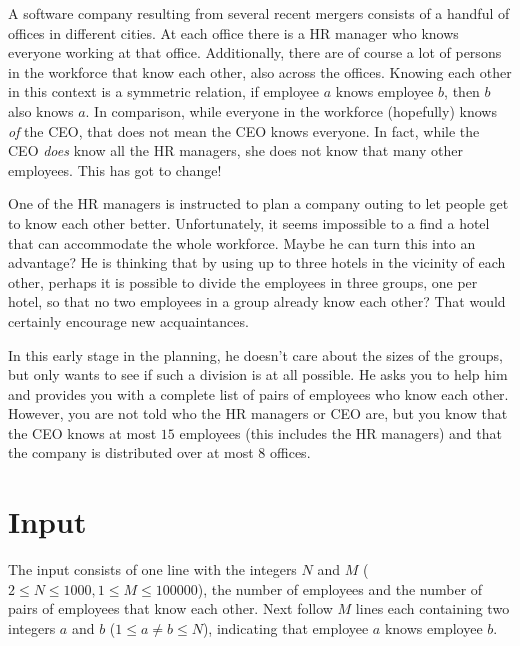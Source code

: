 %

A software company resulting from several recent mergers consists of a handful of offices in different cities. At each office there is a HR manager who knows everyone working at that office. Additionally, there are of course a lot of persons in the workforce that know each other, also across the offices.
Knowing each other in this context is a symmetric relation, if employee $a$ knows employee $b$, then $b$ also knows $a$. In comparison, while everyone in the workforce (hopefully) knows \emph{of} the CEO, that does not mean the CEO knows everyone. In fact, while the CEO \emph{does} know all the HR managers, she does not know that many other employees. This has got to change!

One of the HR managers is instructed to plan a company outing to let people get to know each other better. Unfortunately, it seems impossible to a find a hotel that can accommodate the whole workforce.
Maybe he can turn this into an advantage? He is thinking that by using up to three hotels in the vicinity of each other, perhaps it is possible to divide the employees in three groups, one per hotel, so that no two employees in a group already know each other? That would certainly encourage new acquaintances.

In this early stage in the planning, he doesn't care about the sizes of the groups, but only wants to see if such a division is at all possible. He asks you to help him and provides you with a complete list of pairs of employees who know each other. However, you are not told who the HR managers or CEO are, but you know that the CEO knows at most $15$ employees (this includes the HR managers) and that the company is distributed over at most $8$ offices.

\section*{Input}
The input consists of one line with the integers $N$ and $M$ ($2 \leq N \leq 1000, 1 \leq M \leq 100000$), 
the number of employees and the number of pairs of employees that know each other. 
Next follow $M$ lines each containing two integers $a$ and $b$ ($1\leq a\neq b \leq N$), indicating that 
employee $a$ knows employee $b$.

